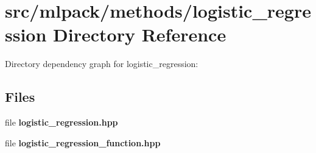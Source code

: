 \section{src/mlpack/methods/logistic\-\_\-regression Directory Reference}
\label{dir_a1858cb9aff7489df14d5f0f273f8930}
Directory dependency graph for logistic\-\_\-regression\-:
\subsection*{Files}
\begin{DoxyCompactItemize}
\item 
file {\bf logistic\-\_\-regression.\-hpp}
\item 
file {\bf logistic\-\_\-regression\-\_\-function.\-hpp}
\end{DoxyCompactItemize}
